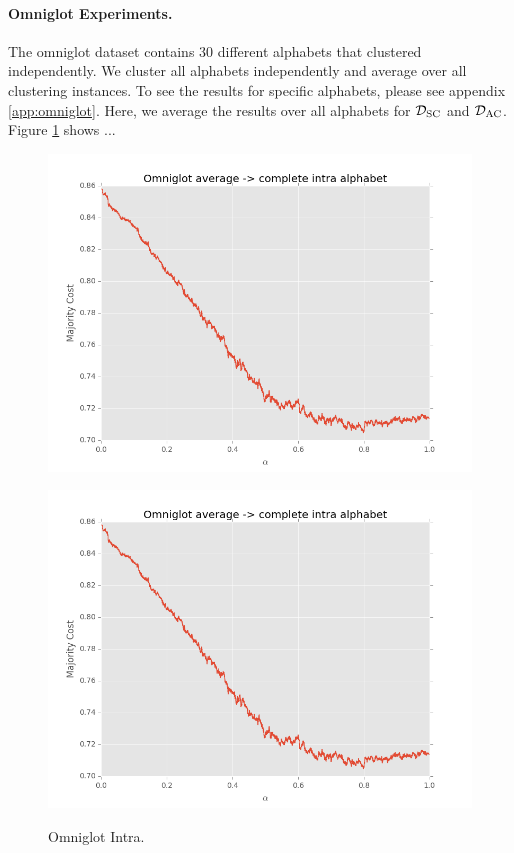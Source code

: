 \paragraph{Omniglot Experiments.} The omniglot dataset contains 30 different alphabets that clustered independently. We cluster all alphabets independently and average over all clustering instances. To see the results for specific alphabets, please see appendix \ref{app:omniglot}. Here, we average the results over all alphabets for $\mathcal{D}_\text{SC}$ and $\mathcal{D}_\text{AC}$. Figure \ref{fig:omniglotintra} shows ...

\begin{figure}[h]
\centering
\begin{minipage}{.45\textwidth}
  \centering
  {\includegraphics[width=\linewidth]{plots/omniglot-ac-average.png}}
\end{minipage}\quad
\begin{minipage}{.45\textwidth}
  \centering
  {\includegraphics[width=\linewidth]{plots/omniglot-ac-average.png}}
\end{minipage}
\caption{%
  Omniglot Intra.}
\label{fig:omniglotintra}
\end{figure}

